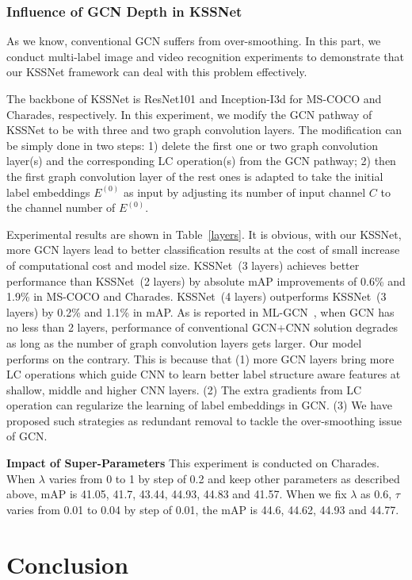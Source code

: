 \documentclass[letterpaper]{article} \usepackage{aaai20}  \usepackage{times}  \usepackage{helvet} \usepackage{courier}  \usepackage[hyphens]{url}  \usepackage{graphicx} \usepackage{subfigure}
\begin{document}
\subsubsection{Influence of GCN Depth in KSSNet}
As we know, conventional GCN suffers from over-smoothing. In this part, we conduct multi-label image and video recognition experiments to demonstrate that our KSSNet framework can deal with this problem effectively. 

The backbone of KSSNet is ResNet101 and Inception-I3d for MS-COCO and Charades, respectively. In this experiment, we modify the GCN pathway of KSSNet to be with three and two graph convolution layers. The modification can be simply done in two steps: 1) delete the first one or two graph convolution layer(s) and the corresponding LC operation(s) from the GCN pathway; 2) then the first graph convolution layer of the rest ones is adapted to take the initial label embeddings $E^{(0)}$ as input by adjusting its number of input channel $C$ to the channel number of $E^{(0)}$. 


Experimental results are shown in Table~\ref{layers}.  It is obvious, with our KSSNet, more GCN layers lead to better classification results at the cost of small increase of computational cost and model size. KSSNet~(3 layers) achieves better performance than KSSNet~(2 layers) by absolute mAP improvements of 0.6\% and 1.9\% in MS-COCO and Charades. KSSNet~(4 layers) outperforms KSSNet~(3 layers) by 0.2\% and 1.1\% in mAP. As is reported in ML-GCN~\cite{chen2019multi}, when GCN has no less than 2 layers, performance of conventional GCN+CNN solution degrades as long as the number of graph convolution layers gets larger. Our model performs on the contrary. This is because that (1) more GCN layers bring more LC operations which guide CNN to learn better label structure aware features at shallow, middle and higher CNN layers. (2) The extra gradients from LC operation can regularize the learning of label embeddings in GCN. (3) We have proposed such strategies as redundant removal to tackle the over-smoothing issue of GCN. 


\textbf{Impact of Super-Parameters}
This experiment is conducted on Charades. When $\lambda$ varies from 0 to 1 by step of 0.2 and keep other parameters as described above, mAP is 41.05, 41.7, 43.44, 44.93, 44.83 and 41.57. When we fix $\lambda$ as 0.6, $\tau$ varies from 0.01 to 0.04 by step of 0.01, the mAP is 44.6, 44.62, 44.93 and 44.77. 


\section{Conclusion}
\end{document}
